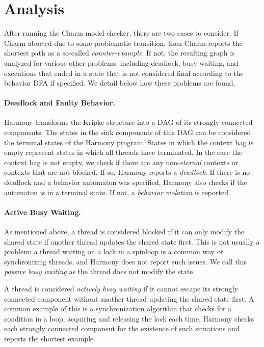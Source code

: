 \documentclass[twocolumn]{article}
\begin{document}
\section{Analysis}

After running the Charm model checker, there are two cases to
consider.  If Charm aborted due to some problematic transition,
then Charm reports the shortest path as a so-called \emph{counter-example}.
If not, the resulting graph is analyzed for various other problems,
including deadlock, busy waiting, and executions
that ended in a state that is not considered final according to the
behavior DFA if specified.  We detail below how these problems are
found.

\paragraph{Deadlock and Faulty Behavior.}

Harmony transforms the Kripke structure into a DAG of its strongly
connected components.  The states in the sink components of this
DAG can be considered the terminal states of the Harmony program.
States in which the context bag is empty represent states in which
all threads have terminated.  In the case the context bag is not
empty, we check if there are any non-\emph{eternal} contexts or
contexts that are not blocked.
If so, Harmony reports a \emph{deadlock}. If there
is no deadlock and a behavior automaton was specified, Harmony also
checks if the automaton is in a terminal state.  If not, a
\emph{behavior violation} is reported.

\paragraph{Active Busy Waiting.}

As mentioned above, a thread is considered blocked if it can only
modify the shared state if another thread updates the shared state
first.  This is not usually a problem: a thread waiting on a lock
in a spinloop is a common way of synchronizing threads, and Harmony
does not report such issues.  We call this \emph{passive busy
waiting} as the thread does not modify the state.

A thread is considered \emph{actively busy waiting} if it cannot
escape its strongly connected component without another thread
updating the shared state first.  A common example of this is a
synchronization algorithm that checks for a condition in a loop,
acquiring and releasing the lock each time.  Harmony checks each
strongly connected component for the existence of such situations
and reports the shortest example.
\end{document}
